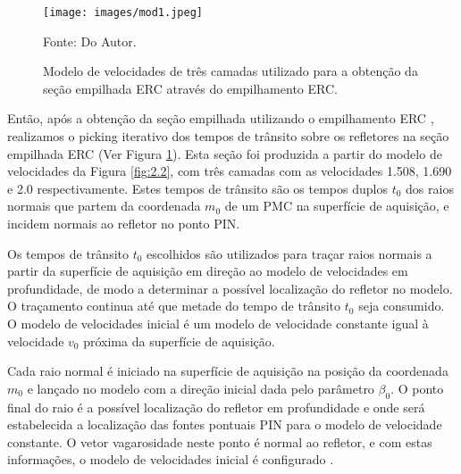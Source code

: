 \begin{figure}[H]
\caption{Modelo de velocidades de três camadas utilizado para a obtenção da seção
empilhada ERC através do empilhamento ERC.}
\begin{center}
\texttt{[image: images/mod1.jpeg]}
\vspace{-0.3cm}
\end{center}
\begin{center}
 Fonte: Do Autor.
\end{center}
\label{fig:2.1}
\end{figure}


Então, após a obtenção da seção empilhada utilizando o empilhamento ERC \cite{relatorio}, realizamos
o picking iterativo dos tempos de trânsito sobre os refletores na seção empilhada ERC (Ver Figura \ref{fig:2.1}). Esta seção foi produzida a partir do modelo de velocidades da Figura \ref{fig:2.2},
com três camadas com as velocidades 1.508, 1.690 e 2.0 respectivamente.
Estes tempos de trânsito são os tempos duplos $t_0$ dos raios normais que partem da coordenada $m_0$
de um PMC na superfície de aquisição, e incidem normais ao refletor no ponto PIN.

Os tempos de trânsito $t_0$ escolhidos são utilizados para traçar raios normais
a partir da superfície de aquisição em direção ao modelo de velocidades
em profundidade,
de modo a determinar a possível localização do refletor no modelo.
O traçamento continua até que metade do tempo de trânsito $t_0$ seja consumido.
O modelo de velocidades inicial é um modelo de velocidade constante igual à velocidade $v_0$
próxima da superfície de aquisição.

Cada raio normal é iniciado na superfície de aquisição na posição da coordenada $m_0$ e lançado no modelo 
com a direção inicial dada pelo parâmetro $\beta_0$.
O ponto final do raio é a possível localização do refletor em profundidade
e onde será estabelecida a localização das fontes pontuais PIN para o modelo de velocidade
constante. O vetor vagarosidade neste ponto é
normal ao refletor, e com estas informações, o modelo de velocidades inicial é configurado \cite{niptomo}.

